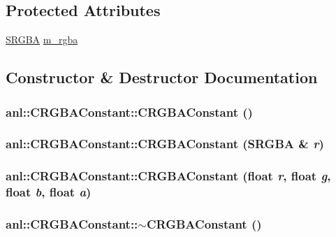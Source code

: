 \subsection*{Protected Attributes}
\begin{DoxyCompactItemize}
\item 
\hyperlink{structanl_1_1SRGBA}{SRGBA} \hyperlink{classanl_1_1CRGBAConstant_a0f6ae18a9215b83112c57f9081d8c432}{m\_\-rgba}
\end{DoxyCompactItemize}


\subsection{Constructor \& Destructor Documentation}
\hypertarget{classanl_1_1CRGBAConstant_ad4b68117c0791773256ecad93d80e711}{
\subsubsection[{CRGBAConstant}]{\setlength{\rightskip}{0pt plus 5cm}anl::CRGBAConstant::CRGBAConstant ()}}
\label{classanl_1_1CRGBAConstant_ad4b68117c0791773256ecad93d80e711}
\hypertarget{classanl_1_1CRGBAConstant_a4958c1c726d5e0d2623478d123a142af}{
\subsubsection[{CRGBAConstant}]{\setlength{\rightskip}{0pt plus 5cm}anl::CRGBAConstant::CRGBAConstant ({\bf SRGBA} \& {\em r})}}
\label{classanl_1_1CRGBAConstant_a4958c1c726d5e0d2623478d123a142af}
\hypertarget{classanl_1_1CRGBAConstant_ade5bebec68dd9c5d24cd9f58b16eab3f}{
\subsubsection[{CRGBAConstant}]{\setlength{\rightskip}{0pt plus 5cm}anl::CRGBAConstant::CRGBAConstant (float {\em r}, \/  float {\em g}, \/  float {\em b}, \/  float {\em a})}}
\label{classanl_1_1CRGBAConstant_ade5bebec68dd9c5d24cd9f58b16eab3f}
\hypertarget{classanl_1_1CRGBAConstant_aff4be139718c71e0182d8ddad7003a95}{
\subsubsection[{$\sim$CRGBAConstant}]{\setlength{\rightskip}{0pt plus 5cm}anl::CRGBAConstant::$\sim$CRGBAConstant ()}}
\label{classanl_1_1CRGBAConstant_aff4be139718c71e0182d8ddad7003a95}


